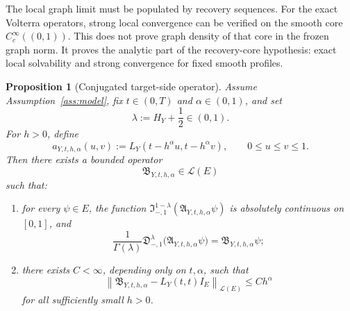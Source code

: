 \documentclass[11pt,a4paper]{amsart}
\theoremstyle{plain}
\newtheorem{proposition}[theorem]{Proposition}
\theoremstyle{definition}
\theoremstyle{remark}
\begin{document}
The local graph limit must be populated by recovery sequences.  For the exact Volterra operators,
strong local convergence can be verified on the smooth core \(C_c^\infty((0,1))\).  This does not
prove graph density of that core in the frozen graph norm.  It proves the analytic part of the
recovery-core hypothesis: exact local solvability and strong convergence for fixed smooth profiles.

\begin{proposition}[Conjugated target-side operator]\label{prop:BY}
Assume Assumption~\ref{ass:model}, fix \(t\in(0,T)\) and \(\alpha\in(0,1)\), and set
\[
\lambda:=H_Y+\frac12\in(0,1).
\]
For \(h>0\), define
\[
a_{Y,t,h,\alpha}(u,v):=
L_Y(t-h^\alpha u,t-h^\alpha v),
\qquad
0\le u\le v\le 1.
\]
Then there exists a bounded operator
\[
\mathfrak B_{Y,t,h,\alpha}\in\mathcal L(E)
\]
such that:
\begin{enumerate}[label=(\roman*)]
\item for every \(\psi\in E\), the function
\(\mathfrak I_{-,1}^{1-\lambda}(\mathfrak A_{Y,t,h,\alpha}\psi)\) is absolutely continuous on
\([0,1]\), and
\begin{equation}\label{eq:BY-conj}
\frac{1}{\Gamma(\lambda)}
\mathfrak D_{-,1}^{\lambda}\bigl(\mathfrak A_{Y,t,h,\alpha}\psi\bigr)
=
\mathfrak B_{Y,t,h,\alpha}\psi;
\end{equation}
\item there exists \(C<\infty\), depending only on \(t,\alpha\), such that
\begin{equation}\label{eq:BY-close}
\left\|
\mathfrak B_{Y,t,h,\alpha}-L_Y(t,t)I_E
\right\|_{\mathcal L(E)}
\le
Ch^\alpha
\end{equation}
for all sufficiently small \(h>0\).
\end{enumerate}
\end{proposition}
\end{document}

